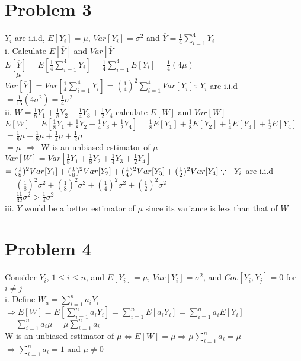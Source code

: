 \documentclass[11pt, oneside]{article}   	%
\begin{document}
\section{Problem 3}
$Y_i$ are i.i.d, $E[Y_i]=\mu$, $Var[Y_i]=\sigma^{2}$ and $\overline{Y}=\frac{1}{4}\sum_{i=1}^{4}Y_i$\\

i. Calculate $E[\overline{Y}]$ and $Var[\overline{Y}]$\\
\indent$E[\overline{Y}]=E[\frac{1}{4}\sum_{i=1}^{4}Y_i]=\frac{1}{4}\sum_{i=1}^{4}E[Y_i]=\frac{1}{4}(4\mu)$\\
\indent\indent$=\mu$\\
\indent$Var[\overline{Y}]=Var[\frac{1}{4}\sum_{i=1}^{4}Y_i]=(\frac{1}{4})^{2}\sum_{i=1}^{4}Var[Y_i]$\hfill$\because\  Y_i$ are i.i.d\\
\indent\indent$=\frac{1}{16}(4\sigma^{2})=\frac{1}{4}\sigma^{2}$\\

ii. $W=\frac{1}{8}Y_1+\frac{1}{8}Y_2+\frac{1}{4}Y_3+\frac{1}{2}Y_4$ calculate $E[W]$ and $Var[W]$\\
$E[W]=E[\frac{1}{8}Y_1+\frac{1}{8}Y_2+\frac{1}{4}Y_3+\frac{1}{2}Y_4]=\frac{1}{8}E[Y_1]+\frac{1}{8}E[Y_2]+\frac{1}{4}E[Y_3]+\frac{1}{2}E[Y_4]$\\
\indent$=\frac{1}{8}\mu+\frac{1}{8}\mu+\frac{1}{4}\mu+\frac{1}{2}\mu$\\
\indent$=\mu\ \ \Rightarrow \ \ $W is an unbiased estimator of $\mu$
$Var[W]=Var[\frac{1}{8}Y_1+\frac{1}{8}Y_2+\frac{1}{4}Y_3+\frac{1}{2}Y_4]$\\
\indent$=(\frac{1}{8})^{2}Var[Y_1]+(\frac{1}{8})^{2}Var[Y_2]+(\frac{1}{4})^{2}Var[Y_3]+(\frac{1}{2})^{2}Var[Y_4]\hfill\because\ \ Y_i$ are i.i.d
\indent$=(\frac{1}{8})^{2}\sigma^{2}+(\frac{1}{8})^{2}\sigma^{2}+(\frac{1}{4})^{2}\sigma^{2}+(\frac{1}{2})^{2}\sigma^{2}$\\
\indent$=\frac{11}{32}\sigma^{2}>\frac{1}{4}\sigma^{2}$\\

iii. $\overline{Y}$ would be a better estimator of $\mu$ since its variance is less than that of $W$

\section{Problem 4}
Consider $Y_i$, $1\leq i \leq n$, and $E[Y_i]=\mu$, $Var[Y_i]=\sigma^{2}$, and $Cov[Y_i,Y_j]=0$ for $i\neq j$\\

i. Define $W_a=\sum_{i=1}^{n} a_i Y_i$ \\
$\Rightarrow E[W]=E[\sum_{i=1}^{n} a_i Y_i]=\sum_{i=1}^{n}E[a_i Y_i]=\sum_{i=1}^{n}a_i E[Y_i]$\\
\indent$=\sum_{i=1}^{n}a_i \mu=\mu\sum_{i=1}^{n}a_i$\\
\indent W is an unbiased estimator of $\mu \iff E[W]=\mu\Rightarrow \mu\sum_{i=1}^{n}a_i=\mu$\\
\indent$\Rightarrow \sum_{i=1}^{n}a_i = 1$ and $\mu\neq 0$\\
\end{document}
